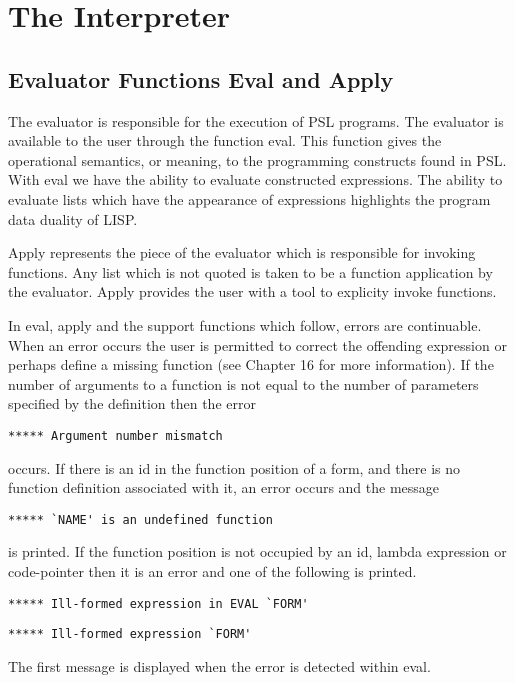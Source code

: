 \chapter*{The Interpreter}

\section{Evaluator Functions Eval and Apply}

  The   evaluator  is  responsible  for  the  execution  of  PSL
programs. The evaluator is available to  the  user  through  the
function  eval.   This function gives the operational semantics,
or meaning, to the programming constructs found in  PSL.    With
eval  we  have  the ability to evaluate constructed expressions.
The ability to evaluate  lists  which  have  the  appearance  of
expressions highlights the program data duality of LISP.

  Apply   represents   the  piece  of  the  evaluator  which  is
responsible for invoking functions.    Any  list  which  is  not
quoted  is  taken to be a function application by the evaluator.
Apply  provides  the  user  with  a  tool  to  explicity  invoke
functions.

  In  eval, apply and the support functions which follow, errors
are continuable.  When an error occurs the user is permitted  to
correct  the  offending  expression  or perhaps define a missing
function (see Chapter 16 for more information).  If  the  number
of  arguments  to  a  function  is  not  equal  to the number of
parameters specified by the definition then the error

\begin{verbatim}
***** Argument number mismatch
\end{verbatim}
occurs.  If there is an id in the function position of  a  form,
and there is no function definition associated with it, an error
occurs and the message

\begin{verbatim}
***** `NAME' is an undefined function
\end{verbatim}
is  printed.  If the function position is not occupied by an id,
lambda expression or code-pointer then it is an error and one of
the following is printed.

\begin{verbatim}
***** Ill-formed expression in EVAL `FORM'
\end{verbatim}
\begin{verbatim}
***** Ill-formed expression `FORM'
\end{verbatim}
The first message is displayed when the error is detected within
eval.

